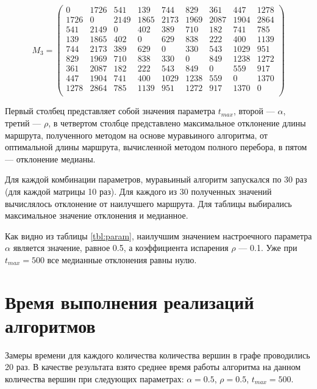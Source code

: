 \begin{equation}
	\label{matrix3}
	M_3 = \begin{pmatrix}
	0	&1726	&541	&139	&744	&829	&361	&447	&1278\\
	1726	&0	&2149	&1865	&2173	&1969	&2087	&1904	&2864\\
	541	&2149	&0	&402	&389	&710	&182	&741	&785\\
	139	&1865	&402	&0	&629	&838	&222	&400	&1139\\
	744	&2173	&389	&629	&0	&330	&543	&1029	&951\\
	829	&1969	&710	&838	&330	&0	&849	&1238	&1272\\
	361	&2087	&182	&222	&543	&849	&0	&559	&917\\
	447	&1904	&741	&400	&1029	&1238	&559	&0	&1370\\
	1278	&2864	&785	&1139	&951	&1272	&917	&1370	&0\\
	\end{pmatrix}
\end{equation}

Первый столбец представляет собой значения параметра $t_{max}$, второй --- $\alpha$, третий --- $\rho$, в четвертом столбце представлено максимальное отклонение длины маршрута, полученного методом на основе муравьиного алгоритма, от оптимальной длины маршрута, вычисленной методом полного перебора, в пятом --- отклонение медианы.

Для каждой комбинации параметров, муравьиный алгоритм запускался по 30 раз (для каждой матрицы 10 раз). 
Для каждого из 30 полученных значений вычислялось отклонение от наилучшего маршрута. Для таблицы выбирались максимальное значение отклонения и медианное.

Как видно из таблицы \ref{tbl:param}, наилучшим значением настроечного параметра $\alpha$ является значение, равное 0.5, а коэффициента испарения $\rho$ ---  0.1. Уже при $t_{max} = 500$ все медианные отклонения равны нулю.

\section{Время выполнения реализаций алгоритмов}

Замеры времени для каждого количества количества вершин в графе проводились 20 раз. 
В качестве результата взято среднее время работы алгоритма на данном количества вершин при следующих параметрах: $\alpha = 0.5$, $\rho = 0.5$, $ t_{max} = 500$.

